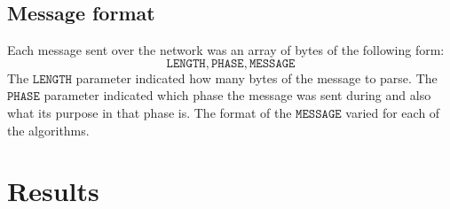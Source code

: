 \subsection{Message format}
Each message sent over the network was an array of bytes of the following form:
\begin{equation*}
    \mathtt{LENGTH}, \mathtt{PHASE}, \mathtt{MESSAGE}
\end{equation*}
The $\mathtt{LENGTH}$ parameter indicated how many bytes of the message to parse. The $\mathtt{PHASE}$ parameter indicated which phase the message was sent during and also what its purpose in that phase is. 
The format of the $\mathtt{MESSAGE}$ varied for each of the algorithms.


\section{Results}
\label{sec:results}

